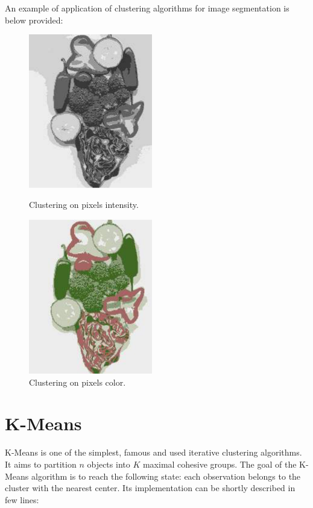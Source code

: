 An example of application of clustering algorithms for image segmentation is below provided:
\begin{figure}[H]
	\begin{minipage}[t]{0.5\linewidth} 
		\centering
		\includegraphics[width=0.48\textwidth]{img/ulearning/fruits_intensity}
		\caption{Clustering on pixels intensity.}
	\end{minipage}        
	\hspace{1.cm}
	\begin{minipage}[t]{0.5\linewidth} 
		\centering
		\includegraphics[width=0.48\textwidth]{img/ulearning/fruits_color}
		\caption{Clustering on pixels color.}
	\end{minipage}
\end{figure}
\FloatBarrier


\newpage
\section{K-Means}
K-Means is one of the simplest, famous and used iterative clustering algorithms. It aims to partition $n$ objects into $K$ maximal cohesive groups. The goal of the K-Means algorithm is to reach the following state: each observation belongs to the cluster with the nearest center. Its implementation can be shortly described in few lines:

